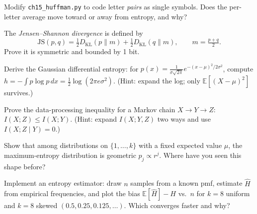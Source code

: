 \begin{exercise}[medium]
Modify \texttt{ch15\_huffman.py} to code letter \emph{pairs} as single
symbols. Does the per-letter average move toward or away from
entropy, and why?
\end{exercise}

\begin{exercise}[medium]
The \emph{Jensen--Shannon divergence} is defined by
\[
\mathrm{JS}(p,q)=\tfrac12 D_{\mathrm{KL}}(p\|m)+\tfrac12
D_{\mathrm{KL}}(q\|m), \qquad m=\tfrac{p+q}{2}.
\]
Prove it is symmetric and bounded by 1 bit.
\end{exercise}

\begin{exercise}[hard]
Derive the Gaussian differential entropy: for
$p(x)=\frac1{\sigma\sqrt{2\pi}}e^{-(x-\mu)^2/2\sigma^2}$, compute
$h=-\int p\log p\,dx=\tfrac12\log(2\pi e\sigma^2)$. (Hint: expand the
log; only $\mathbb E[(X-\mu)^2]$ survives.)
\end{exercise}

\begin{exercise}[hard]
Prove the data-processing inequality for a Markov chain
$X\to Y\to Z$: $I(X;Z)\le I(X;Y)$. (Hint: expand $I(X;Y,Z)$ two ways
and use $I(X;Z\mid Y)=0$.)
\end{exercise}

\begin{exercise}[hard]
Show that among distributions on $\{1,\dots,k\}$ with a fixed
expected value $\mu$, the maximum-entropy distribution is geometric
$p_j\propto r^j$. Where have you seen this shape before?
\end{exercise}

\begin{exercise}[hard]
Implement an entropy estimator: draw $n$ samples from a known pmf,
estimate $\hat H$ from empirical frequencies, and plot the bias
$\mathbb E[\hat H]-H$ vs.\ $n$ for $k=8$ uniform and $k=8$ skewed
$(0.5,0.25,0.125,\dots)$. Which converges faster and why?
\end{exercise}



